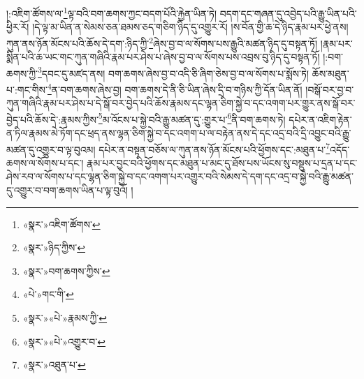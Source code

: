 །:འཇིག་ཚོགས་ལ་\footnote{«སྣར་»འཇིག་ཚོགས་}ལྟ་བའི་བག་ཆགས་ཀྱང་བདག་པོའི་རྐྱེན་ཡིན་ཏེ། བདག་དང་གཞན་དུ་འབྱེད་པའི་རྒྱུ་ཡིན་པའི་ཕྱིར་རོ། །དེ་ལྟ་མ་ཡིན་ན་སེམས་ཅན་ཐམས་ཅད་གཅིག་ཉིད་དུ་འགྱུར་རོ། །ས་བོན་གྱི་ཆ་དེ་ཉིད་རྣམ་པར་ཕྱེ་ནས། ཀུན་ནས་ཉོན་མོངས་པའི་ཆོས་དེ་དག་:ཉིད་ཀྱི་\footnote{«སྣར་»ཉིད་ཀྱིས་}ཞེས་བྱ་བ་ལ་སོགས་པས་རྒྱུའི་མཚན་ཉིད་དུ་བསྟན་ཏོ། །རྣམ་པར་སྨིན་པའི་ཆ་ཡང་གང་ཀུན་གཞིའི་རྣམ་པར་ཤེས་པ་ཞེས་བྱ་བ་ལ་སོགས་པས་འབྲས་བུ་ཉིད་དུ་བསྟན་ཏོ། །:བག་ཆགས་ཀྱི་\footnote{«སྣར་»བག་ཆགས་ཀྱིས་}དབང་དུ་མཛད་ནས། བག་ཆགས་ཞེས་བྱ་བ་འདི་ཅི་ཞིག་ཅེས་བྱ་བ་ལ་སོགས་པ་སྨོས་ཏེ། ཆོས་མཐུན་པ་:གང་གིས་\footnote{«པེ་»གང་གི་}ན་བག་ཆགས་ཞེས་བྱ། བག་ཆགས་དེ་ནི་ཅི་ཡིན་ཞེས་དྲི་བ་གཉིས་ཀྱི་དོན་ཡིན་ནོ། །བསྒོ་བར་བྱ་བ་ཀུན་གཞིའི་རྣམ་པར་ཤེས་པ་དེ་སྒོ་བར་བྱེད་པའི་ཆོས་རྣམས་དང་ལྷན་ཅིག་སྐྱེ་བ་དང་འགག་པར་གྱུར་ནས་སྒོ་བར་བྱེད་པའི་ཆོས་དེ་:རྣམས་ཀྱིས་\footnote{«སྣར་»«པེ་»རྣམས་ཀྱི་}མ་འོངས་པ་སྐྱེ་བའི་རྒྱུ་མཚན་དུ་:གྱུར་པ་\footnote{«སྣར་»«པེ་»འགྱུར་བ་}ནི་བག་ཆགས་ཏེ། དཔེར་ན་འཇིག་རྟེན་ན་ཏིལ་རྣམས་མེ་ཏོག་དང་ཕྲད་ནས་ལྷན་ཅིག་སྐྱེ་བ་དང་འགག་པ་ལ་བརྟེན་ནས་དེ་དང་འདྲ་བའི་དྲི་འབྱུང་བའི་རྒྱུ་མཚན་དུ་འགྱུར་བ་ལྟ་བུའམ། དཔེར་ན་བསྟན་བཅོས་ལ་ཀུན་ནས་ཉོན་མོངས་པའི་ཕྱོགས་དང་:མཐུན་པ་\footnote{«སྣར་»འཐུན་པ་}འདོད་ཆགས་ལ་སོགས་པ་དང་། རྣམ་པར་བྱང་བའི་ཕྱོགས་དང་མཐུན་པ་མང་དུ་ཐོས་པས་ཡོངས་སུ་བསྡུས་པ་དྲན་པ་དང་ཤེས་རབ་ལ་སོགས་པ་དང་ལྷན་ཅིག་སྐྱེ་བ་དང་འགག་པར་འགྱུར་བའི་སེམས་དེ་དག་དང་འདྲ་བ་སྐྱེ་བའི་རྒྱུ་མཚན་དུ་འགྱུར་བ་བག་ཆགས་ཡིན་པ་ལྟ་བུའོ། །
